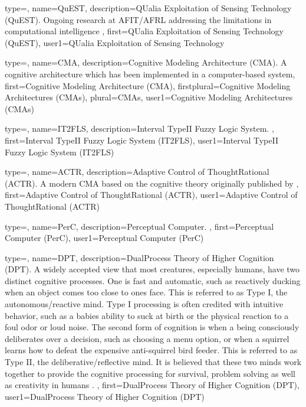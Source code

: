 {
  type=\acronymtype,
  name=QuEST,
  description={QUalia Exploitation of Sensing Technology (QuEST). Ongoing research at AFIT/AFRL addressing the limitations in computational intelligence \citep{RogersEtAl2014}},
  first={QUalia Exploitation of Sensing Technology (QuEST)},
  user1={QUalia Exploitation of Sensing Technology}
}


{
  type=\acronymtype,
  name=CMA,
  description={Cognitive Modeling Architecture (CMA).  A \gls{cognitive architecture} which has been implemented in a computer-based system},
  first={Cognitive Modeling Architecture (CMA)},
  firstplural={Cognitive Modeling Architectures (CMAs)},
  plural=CMAs,
  user1={Cognitive Modeling Architectures (CMAs)}
}

{
  type=\acronymtype,
  name=IT2\textendash{}FLS,
  description={Interval Type\textendash{}II Fuzzy Logic System.  },
  first={Interval Type\textendash{}II Fuzzy Logic System (IT2\textendash{}FLS)},
  user1={Interval Type\textendash{}II Fuzzy Logic System (IT2\textendash{}FLS)}
}

{
  type=\acronymtype,
  name=ACT\textendash{}R,
  description={Adaptive Control of Thought\textendash{}Rational (ACT\textendash{}R).  A modern \gls{CMA} based on the
  cognitive theory originally published by \citet{anderson1998atomic}},
  first={Adaptive Control of Thought\textendash{}Rational (ACT\textendash{}R)},
  user1={Adaptive Control of Thought\textendash{}Rational (ACT\textendash{}R)}
}


{
  type=\acronymtype,
  name=Per\textendash{}C,
  description={Perceptual Computer.   },
  first={Perceptual Computer (Per\textendash{}C)},
  user1={Perceptual Computer (Per\textendash{}C)}
}

{
  type=\acronymtype,
  name=DPT,
  description={Dual\textendash{}Process Theory of Higher Cognition (DPT). A widely accepted view that most creatures, especially humans, have two distinct cognitive processes.  One is fast and automatic, such as reactively ducking when an object comes too close to ones face.  This is referred to as \gls{Type I}, the autonomous/reactive mind. \gls{Type I} processing is often credited with intuitive behavior, such as a babies ability to suck at birth or the physical reaction to a foul odor or loud noise. The second form of cognition is when a being consciously deliberates over a decision, such as choosing a menu option, or when a squirrel learns how to defeat the expensive anti-squirrel bird feeder. This is referred to as \gls{Type II}, the deliberative/reflective mind. It is believed that these two minds work together to provide the cognitive processing for survival, problem solving as well as creativity in humans \citep{Stanovich2013DualProcess, Stanovich2009IntTest}.
},
  first={Dual\textendash{}Process Theory of Higher Cognition (DPT)},
  user1={Dual\textendash{}Process Theory of Higher Cognition (DPT)}
}

